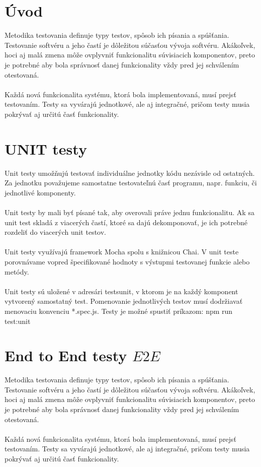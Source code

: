 \documentclass{article}
\begin{document}
    

    \section*{Úvod}

        \textnormal{%
        Metodika testovania definuje typy testov, spôsob ich písania a spúšťania. Testovanie softvéru a jeho častí je dôležitou súčasťou vývoja softvéru. Akákoľvek, hoci aj malá zmena môže ovplyvniť funkcionalitu súvisiacich komponentov, preto je potrebné aby bola správnosť danej funkcionality vždy pred jej schválením otestovaná. \\\\
Každá nová funkcionalita systému, ktorá bola implementovaná, musí prejsť testovaním. Testy sa vyvárajú jednotkové, ale aj integračné, pričom testy musia pokrývať aj určitú časť funkcionality.
        }
		\section*{UNIT testy}

        \textnormal{%
     Unit testy umožňujú testovať individuálne jednotky kódu nezávisle od ostatných. Za jednotku považujeme samostatne testovateľnú časť programu, napr. funkciu, či jednotlivé komponenty. \\\\
Unit testy by mali byť písané tak, aby overovali práve jednu funkcionalitu. Ak sa unit test skladá z viacerých častí, ktoré sa dajú dekomponovať, je ich potrebné rozdeliť do viacerých unit testov.\\\\
Unit testy využívajú framework Mocha spolu s knižnicou Chai. V unit teste porovnávame vopred špecifikované hodnoty s výstupmi testovanej funkcie alebo metódy.\\\\
Unit testy sú uložené v adresári \/tests\/unit, v ktorom je na každý komponent vytvorený samostatný test. Pomenovanie jednotlivých testov musí dodržiavať menovaciu konvenciu *.spec.js. 
Testy je možné spustiť príkazom:
npm run test:unit
        }
				
				   \section*{End to End testy \(E2E\)}

        \textnormal{%
        Metodika testovania definuje typy testov, spôsob ich písania a spúšťania. Testovanie softvéru a jeho častí je dôležitou súčasťou vývoja softvéru. Akákoľvek, hoci aj malá zmena môže ovplyvniť funkcionalitu súvisiacich komponentov, preto je potrebné aby bola správnosť danej funkcionality vždy pred jej schválením otestovaná. \\\\
Každá nová funkcionalita systému, ktorá bola implementovaná, musí prejsť testovaním. Testy sa vyvárajú jednotkové, ale aj integračné, pričom testy musia pokrývať aj určitú časť funkcionality.
        }
				
\end{document}
